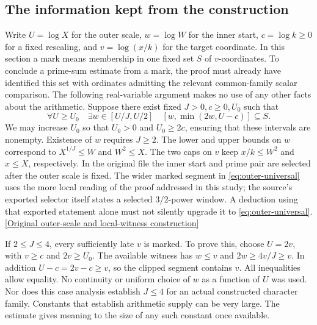 \documentclass[12pt,letterpaper]{article}
\begin{document}
\subsection{The information kept from the construction}
Write \(U=\log X\) for the outer scale, \(w=\log W\) for the inner start, \(c=\log k\ge0\) for a fixed rescaling, and \(v=\log(x/k)\) for the target coordinate. In this section a mark means membership in one fixed set \(S\) of \(v\)-coordinates. To conclude a prime-sum estimate from a mark, the proof must already have identified this set with ordinates admitting the relevant common-family scalar comparison. The following real-variable argument makes no use of any other facts about the arithmetic. Suppose there exist fixed \(J>0,c\ge0,U_0\) such that
\begin{equation}
 \forall U\ge U_0\quad\exists w\in[U/J,U/2]\quad
       [w,\min(2w,U-c)]\subseteq S .
 \label{eq:outer-universal}
\end{equation}
We may increase \(U_0\) so that \(U_0>0\) and \(U_0\ge2c\), ensuring that these intervals are nonempty. Existence of \(w\) requires \(J\ge2\). The lower and upper bounds on \(w\) correspond to \(X^{1/J}\le W\) and \(W^2\le X\). The two caps on \(v\) keep \(x/k\le W^2\) and \(x\le X\), respectively. In the original file the inner start and prime pair are selected after the outer scale is fixed. The wider marked segment in \eqref{eq:outer-universal} uses the more local reading of the proof addressed in this study; the source's exported selector itself states a selected \(3/2\)-power window. A deduction using that exported statement alone must not silently upgrade it to \eqref{eq:outer-universal}. \href{https://github.com/nousentllc/riemann-hypothesis/blob/40e56bab026552e089d7afcfeff08d2defb9c005/src/Development/AutomorphicArithmetic/CharacterBoxes/WinPairs.lean#L23-L78}{[Original outer-scale and local-witness construction]}

If \(2\le J\le4\), every sufficiently late \(v\) is marked. To prove this, choose \(U=2v\), with \(v\ge c\) and \(2v\ge U_0\). The available witness has \(w\le v\) and \(2w\ge4v/J\ge v\). In addition \(U-c=2v-c\ge v\), so the clipped segment contains \(v\). All inequalities allow equality. No continuity or uniform choice of \(w\) as a function of \(U\) was used. Nor does this case analysis establish \(J\le4\) for an actual constructed character family. Constants that establish arithmetic supply can be very large. The estimate gives meaning to the size of any such constant once available.
\end{document}
